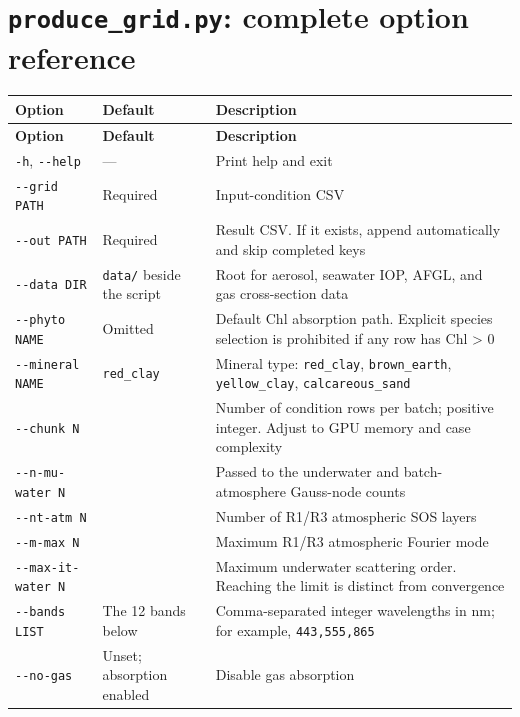 \section{\texttt{produce\_\allowbreak{}grid.\allowbreak{}py}: complete option reference}
\label{sec:auto:06_python_batch:4}

{\TableFont
\begin{longtable}{@{}>{\raggedright\arraybackslash}p{}>{\raggedright\arraybackslash}p{}>{\raggedright\arraybackslash}p{}@{}}
\toprule
\textbf{Option} & \textbf{Default} & \textbf{Description} \\
\midrule
\endfirsthead
\toprule
\textbf{Option} & \textbf{Default} & \textbf{Description} \\
\midrule
\endhead
\bottomrule
\endfoot
\texttt{-\allowbreak{}h}, \texttt{-\allowbreak{}-\allowbreak{}help} & --- & Print help and exit \\
\texttt{-\allowbreak{}-\allowbreak{}grid PATH} & Required & Input-condition CSV \\
\texttt{-\allowbreak{}-\allowbreak{}out PATH} & Required & Result CSV. If it exists, append automatically and skip completed keys \\
\texttt{-\allowbreak{}-\allowbreak{}data DIR} & \texttt{data/\allowbreak{}} beside the script & Root for aerosol, seawater IOP, AFGL, and gas cross-section data \\
\texttt{-\allowbreak{}-\allowbreak{}phyto NAME} & Omitted & Default Chl absorption path. Explicit species selection is prohibited if any row has Chl > 0 \\
\texttt{-\allowbreak{}-\allowbreak{}mineral NAME} & \texttt{red\_\allowbreak{}clay} & Mineral type: \texttt{red\_\allowbreak{}clay}, \texttt{brown\_\allowbreak{}earth}, \texttt{yellow\_\allowbreak{}clay}, \texttt{calcareous\_\allowbreak{}sand} \\
\texttt{-\allowbreak{}-\allowbreak{}chunk N} & 64 & Number of condition rows per batch; positive integer. Adjust to GPU memory and case complexity \\
\texttt{-\allowbreak{}-\allowbreak{}n-\allowbreak{}mu-\allowbreak{}water N} & 24 & Passed to the underwater and batch-atmosphere Gauss-node counts \\
\texttt{-\allowbreak{}-\allowbreak{}nt-\allowbreak{}atm N} & 400 & Number of R1/R3 atmospheric SOS layers \\
\texttt{-\allowbreak{}-\allowbreak{}m-\allowbreak{}max N} & 16 & Maximum R1/R3 atmospheric Fourier mode \\
\texttt{-\allowbreak{}-\allowbreak{}max-\allowbreak{}it-\allowbreak{}water N} & 500 & Maximum underwater scattering order. Reaching the limit is distinct from convergence \\
\texttt{-\allowbreak{}-\allowbreak{}bands LIST} & The 12 bands below & Comma-separated integer wavelengths in nm; for example, \texttt{443,\allowbreak{}555,\allowbreak{}865} \\
\texttt{-\allowbreak{}-\allowbreak{}no-\allowbreak{}gas} & Unset; absorption enabled & Disable gas absorption \\
\end{longtable}
}

